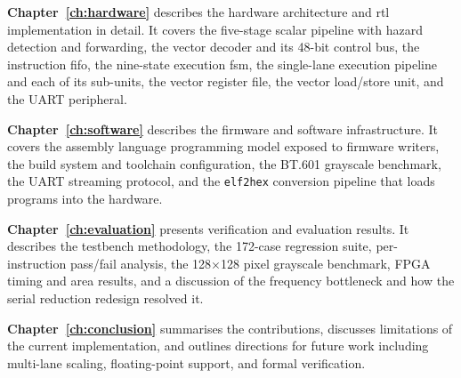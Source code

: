 \textbf{Chapter~\ref{ch:hardware}} describes the hardware architecture and
\gls{rtl} implementation in detail. It covers the five-stage scalar pipeline with
hazard detection and forwarding, the vector decoder and its 48-bit control bus, the
instruction \gls{fifo}, the nine-state execution \gls{fsm}, the single-lane execution
pipeline and each of its sub-units, the vector register file, the vector load/store unit,
and the UART peripheral.

\textbf{Chapter~\ref{ch:software}} describes the firmware and software infrastructure.
It covers the assembly language programming model exposed to firmware writers, the
build system and toolchain configuration, the BT.601 grayscale benchmark, the UART
streaming protocol, and the \texttt{elf2hex} conversion pipeline that loads programs
into the hardware.

\textbf{Chapter~\ref{ch:evaluation}} presents verification and evaluation results.
It describes the testbench methodology, the 172-case regression suite, per-instruction
pass/fail analysis, the 128$\times$128 pixel grayscale benchmark, FPGA timing and
area results, and a discussion of the frequency bottleneck and how the serial reduction
redesign resolved it.

\textbf{Chapter~\ref{ch:conclusion}} summarises the contributions, discusses limitations
of the current implementation, and outlines directions for future work including
multi-lane scaling, floating-point support, and formal verification.
